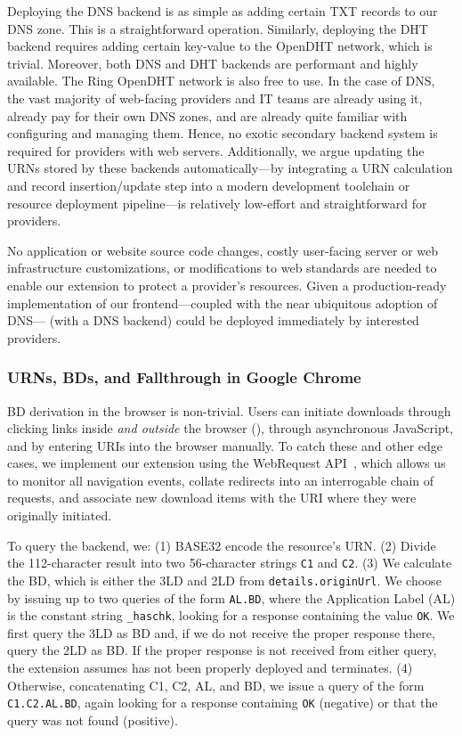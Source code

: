 Deploying the DNS backend is as simple as adding certain TXT records to our DNS
zone. This is a straightforward operation. Similarly, deploying the DHT backend
requires adding certain key-value to the OpenDHT network, which is trivial.
Moreover, both DNS and DHT backends are performant and highly available. The
Ring OpenDHT network is also free to use. In the case of DNS, the vast majority
of web-facing providers and IT teams are already using it, already pay for their
own DNS zones, and are already quite familiar with configuring and managing
them. Hence, no exotic secondary backend system is required for providers with
web servers. Additionally, we argue updating the URNs stored by these backends
automatically---by integrating a URN calculation and record insertion/update
step into a modern development toolchain or resource deployment pipeline---is
relatively low-effort and straightforward for providers.

No application or website source code changes, costly user-facing server or web
infrastructure customizations, or modifications to web standards are needed to
enable our extension to protect a provider's resources. Given a production-ready
implementation of our frontend---coupled with the near ubiquitous adoption of
DNS---\SYSTEM{} (with a DNS backend) could be deployed immediately by interested
providers.

\subsubsection{URNs, BDs, and Fallthrough in Google Chrome}

BD derivation in the browser is non-trivial. Users can initiate downloads
through clicking links inside \emph{and outside} the browser (), through asynchronous JavaScript, and by entering URIs into the
browser manually. To catch these and other edge cases, we implement our
extension using the WebRequest API~\cite{ExtensionAPI}, which allows us to
monitor all navigation events, collate redirects into an interrogable chain of
requests, and associate new download items with the URI where they were
originally initiated.

To query the backend, we: (1) BASE32 encode the resource's URN. (2) Divide the
112-character result into two 56-character strings \texttt{C1} and \texttt{C2}.
(3) We calculate the BD, which is either the 3LD and 2LD from
\texttt{details.originUrl}. We choose by issuing up to two queries of the form
\texttt{AL.BD}, where the Application Label (AL) is the constant string
\texttt{\_haschk}, looking for a response containing the value \texttt{OK}. We
first query the 3LD as BD and, if we do not receive the proper response there,
query the 2LD as BD. If the proper response is not received from either query,
the extension assumes \SYSTEM{} has not been properly deployed and terminates.
(4) Otherwise, concatenating C1, C2, AL, and BD, we issue a query of the form
\texttt{C1.C2.AL.BD}, again looking for a response containing \texttt{OK}
(negative) or that the query was not found (positive).

